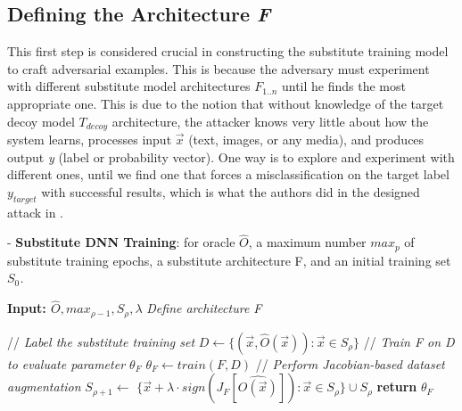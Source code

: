 \documentclass[grad,lot,lof,11pt,oneside,onehalfspace]{RUthesis}
\begin{document}
\subsection{Defining the Architecture \textit{F}}
This first step is considered crucial in constructing the substitute training model to craft adversarial examples. This is because the adversary must experiment with different substitute model architectures \textit{$F_{1..n}$} until he finds the most appropriate one. This is due to the notion that without knowledge of the target decoy model \textit{$T_{decoy}$} architecture, the attacker knows very little about how the system learns, processes input $\vec{x}$ (text, images, or any media), and produces output \textit{y} (label or probability vector). One way is to explore and experiment with different ones, until we find one that forces a misclassification on the target label $y_{target}$ with successful results, which is what the authors did in the designed attack in \cite{papernot_practical_2017}.
\begin{algorithm}
	\caption{- \textbf{Substitute DNN Training}: for oracle $\hat{O}$, a maximum number \textit{$max_{p}$} of substitute training epochs, a substitute architecture  F, and an initial training set \textit{$S_{0}$.}}\label{euclid}
	\begin{algorithmic}[1]
		\State \textbf{Input: $\hat{O}, max_{\rho-1}, S_{\rho}, \lambda$}
		\State \textit{Define architecture \textit{F}}
		
		\State \quad \textrm{//} \quad \textit{Label the substitute training set}
		\State$D\leftarrow\{(\vec{x},\hat{O}(\vec{x})):\vec{x}\in S_{\rho}\}$
		\State\quad \textrm{//} \quad \textit{Train F on D to evaluate parameter $\theta_{F}$}
		\State $\theta_{F} \leftarrow train(F,D)$
		\State\quad \textrm{//} \quad \textit{Perform Jacobian-based dataset augmentation}
		\State $S_{\rho+1}\leftarrow$ ${\{\vec{x}+\lambda \cdotp sign(J_{F}[\hat{O(\vec{x})}]):\vec{x}\in S_{\rho}\}} \cup S_{\rho}$
		\EndFor
		\State \textbf{return} $\theta_{F}$
	\end{algorithmic}
\end{algorithm}
\end{document}
